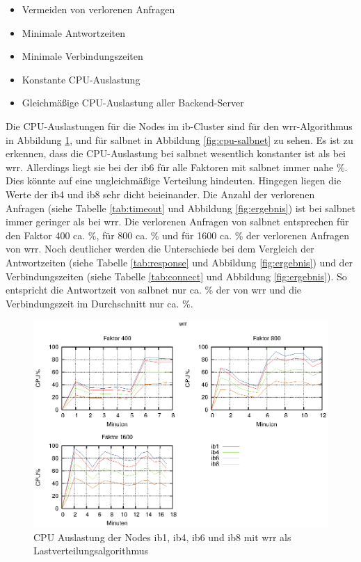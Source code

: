 \documentclass[a4paper, 12pt, BCOR10mm, DIV12, toc=bibliography, toc=listof, german]{scrbook}
\begin{document}
			\begin{itemize}
				\item Vermeiden von verlorenen Anfragen
				\item Minimale Antwortzeiten
				\item Minimale Verbindungszeiten
				\item Konstante CPU-Auslastung
				\item Gleichmäßige CPU-Auslastung aller Backend-Server
			\end{itemize}

			Die CPU-Auslastungen für die Nodes im ib-Cluster sind für den wrr-Algorithmus in Abbildung
			\ref{fig:cpu-wrr}, und für salbnet in Abbildung \ref{fig:cpu-salbnet} zu sehen. Es ist zu
			erkennen, dass die CPU-Auslastung bei salbnet wesentlich konstanter ist als bei wrr.
			Allerdings liegt sie bei der ib6 für alle Faktoren mit salbnet immer nahe \unit[100]{\%}. Dies könnte
			auf eine ungleichmäßige Verteilung hindeuten. Hingegen liegen die Werte der ib4 und ib8 sehr
			dicht beieinander. Die Anzahl der verlorenen Anfragen (siehe Tabelle \ref{tab:timeout} und
			Abbildung \ref{fig:ergebnis}) ist bei salbnet immer geringer als bei wrr.  Die verlorenen
			Anfragen von salbnet entsprechen für den Faktor 400 ca. \unit[25]{\%}, für 800 ca. \unit[33]{\%} und für 1600
			ca. \unit[50]{\%} der verlorenen Anfragen von wrr. Noch deutlicher werden die Unterschiede bei dem
			Vergleich der
			Antwortzeiten (siehe Tabelle \ref{tab:response} und Abbildung \ref{fig:ergebnis}) und der
			Verbindungszeiten  (siehe Tabelle \ref{tab:connect} und Abbildung \ref{fig:ergebnis}).
			So entspricht die Antwortzeit von salbnet nur ca. \unit[15]{\%} der von wrr und die Verbindungszeit im
			Durchschnitt nur ca. \unit[30]{\%}.

			\begin{figure}
				\centering
				\includegraphics[width=14cm]{plots/cpu-wrr}
				\caption{CPU Auslastung der Nodes ib1, ib4, ib6 und ib8 mit wrr als
				Lastverteilungsalgorithmus}
				\label{fig:cpu-wrr}
			\end{figure}
\end{document}
